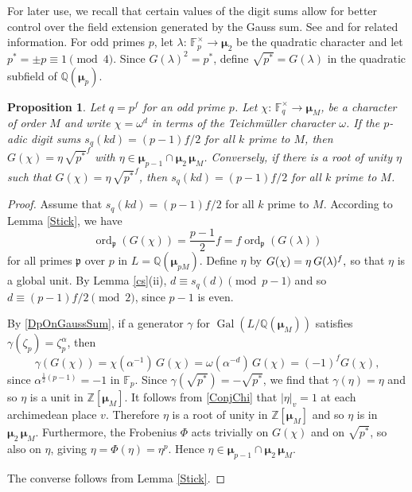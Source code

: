 \documentclass[12pt]{amsart}  \usepackage{amsmath,amssymb,enumerate,amscd,tikz,url}
\numberwithin{equation}{section}
\newtheorem{prop}[equation]{Proposition}
\theoremstyle{definition}
\newcommand{\F}{{\mathbb F}}
\newcommand{\Q}{{\mathbb Q}}
\newcommand{\Z}{{\mathbb Z}}
\newcommand{\Mu}{\boldsymbol \mu}
\newcommand{\gp}{{\mathfrak p}}
\newcommand{\Gal}{\operatorname{Gal}}
\newcommand{\ord}{\operatorname{ord}}
\newcommand{\vv}[1]{{\left\vert {#1} \right\vert}}
\begin{document}
\vspace{5 pt}

For later use, we recall that certain values of the digit sums allow for better control over the field extension generated by the Gauss sum.  See \cite[Lemma 6]{Ev2} and \cite{Ol} for related information.  For odd primes $p$, let $\lambda\!: \, \F_p^\times \to \Mu_2$ be the quadratic character and let $p^* = \pm p \equiv 1 \pmod{4}$.  Since $G(\lambda)^2 = p^*$, define $\sqrt{p^*} = G(\lambda)$ in the quadratic subfield of $\Q(\Mu_{p})$.  

\begin{prop} \label{GoodpDigits}
Let $q = p^f$ for an odd prime $p$.  Let $\chi\!: \, \F_q^\times \to \Mu_M$, be a character of order $M$ and write $\chi = \omega^d$ in terms of the Teichm\"{u}ller character $\omega$.  If the $p$-adic digit sums $s_q(kd) = (p-1)f/2$ for all $k$ prime to $M$, then $G(\chi) = \eta \, \sqrt{p^*}^f$ with $\eta \in \Mu_{p-1} \cap \Mu_2 \, \Mu_M$.  Conversely, if there is a root of unity $\eta$ such that $G(\chi) = \eta \, \sqrt{p^*}^f$, then $s_q(kd) = (p-1)f/2$ for all $k$ prime to $M$.
\end{prop}

\begin{proof}
Assume that $s_q(kd) = (p-1)f/2$ for all $k$ prime to $M$.   According to Lemma \ref{Stick}, we have
$$
\ord_{\gp}(G(\chi)) = \frac{p-1}{2}f = f \ord_{\gp}(G(\lambda))
$$
 for all primes $\gp$ over $p$ in $L = \Q(\Mu_{pM})$.  Define $\eta$ by 
 $
 G(\chi) = \eta  \hspace{2 pt} G(\lambda)^f,
 $ 
 so that $\eta$ is a global unit.  By Lemma \ref{cs}(ii), $d \equiv s_q(d) \pmod{p-1}$ and so $d \equiv (p-1)f/2 \pmod{2}$, since $p-1$ is even.

By \eqref{DpOnGaussSum}, if a generator $\gamma$ for $\Gal(L/\Q(\Mu_M))$ satisfies $\gamma(\zeta_p) = \zeta_p^\alpha$, then   
$$
\gamma(G(\chi)) = \chi(\alpha^{-1}) \, G(\chi) = \omega(\alpha^{-d}) \, G(\chi) = (-1)^f G(\chi), 
$$
since $\alpha^{\frac{1}{2}(p-1)} = -1$ in $\F_p$.   Since $\gamma(\sqrt{p^*}) = - \sqrt{p^*}$, we find that $\gamma(\eta) = \eta$ and so $\eta$ is a unit in $\Z[\Mu_M]$.  It follows from \eqref{ConjChi} that $\vv{\eta}_v = 1$ at each archimedean place $v$.  Therefore $\eta$ is a root of unity in $\Z[\Mu_M]$ and so $\eta$ is in $\Mu_2 \, \Mu_M$.  Furthermore, the Frobenius $\Phi$ acts trivially on $G(\chi)$ and on $\sqrt{p^*}$, so also on $\eta$, giving $\eta = \Phi(\eta) = \eta^p$.  Hence $\eta \in \Mu_{p-1} \cap \Mu_2 \, \Mu_M$.  

The converse follows from Lemma \ref{Stick}.
\end{proof}
\end{document}
